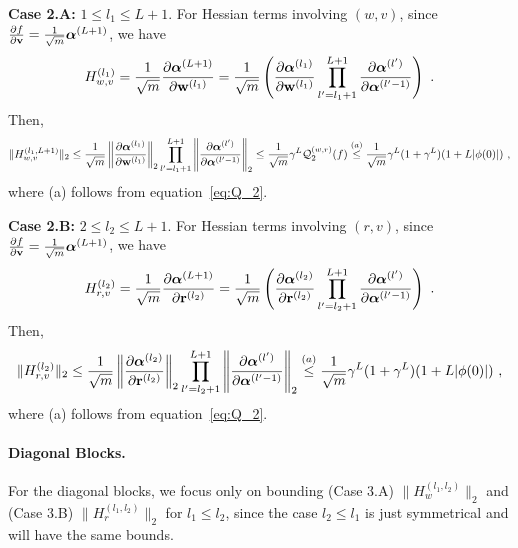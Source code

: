 {\bf Case 2.A:} $1 \leq l_1 \leq L+1$. For Hessian terms involving $(w,v)$, since $\frac{\partial f}{\partial \mathbf{v}} = \frac{1}{\sqrt{m}} \boldsymbol{\alpha}^{(L+1)}$, we have 
\begin{align*}
H_{w,v}^{(l_1)} = \frac{1}{\sqrt{m}}  \frac{\partial \boldsymbol{\alpha}^{(L+1)}}{\partial \mathbf{w}^{(l_1)}} = \frac{1}{\sqrt{m}} \left( \frac{\partial \boldsymbol{\alpha}^{(l_1)}}{\partial \mathbf{w}^{(l_1)}} \prod_{l'=l_1+1}^{L+1} \frac{\partial \boldsymbol{\alpha}^{(l')}}{\partial \boldsymbol{\alpha}^{(l'-1)}}  \right)~.
\end{align*}
Then,
\begin{align*}
 \| H_{w,v}^{(l_1,L+1)} \|_2 \leq \frac{1}{\sqrt{m}} \left\| \frac{\partial \boldsymbol{\alpha}^{(l_1)}}{\partial \mathbf{w}^{(l_1)}} \right\|_2 \prod_{l'=l_1+1}^{L+1} \left\| \frac{\partial \boldsymbol{\alpha}^{(l')}}{\partial \boldsymbol{\alpha}^{(l'-1)}} \right\|_2 \leq \frac{1}{\sqrt{m}} \gamma^L {\cal Q}_2^{(w,r)}(f)\overset{(a)}{\leq} \frac{1}{\sqrt{m}}\gamma^L(1+\gamma^L)(1+L|\phi(0)|)~,   
\end{align*}
where (a) follows from equation~\eqref{eq:Q_2}.

{\bf Case 2.B:} $2 \leq l_2 \leq L+1$. For Hessian terms involving $(r,v)$, since $\frac{\partial f}{\partial \mathbf{v}} = \frac{1}{\sqrt{m}} \boldsymbol{\alpha}^{(L+1)}$,  we have 
\begin{align*}
H_{r,v}^{(l_2)} = \frac{1}{\sqrt{m}}  \frac{\partial \boldsymbol{\alpha}^{(L+1)}}{\partial \mathbf{r}^{(l_2)}}
= \frac{1}{\sqrt{m}} \left( \frac{\partial \boldsymbol{\alpha}^{(l_2)}}{\partial \mathbf{r}^{(l_2)}} \prod_{l'=l_2+1}^{L+1} \frac{\partial \boldsymbol{\alpha}^{(l')}}{\partial \boldsymbol{\alpha}^{(l'-1)}}  \right)~.
\end{align*}
Then,
\begin{align*}
 \| H_{r,v}^{(l_2)} \|_2 \leq \frac{1}{\sqrt{m}} \left\| \frac{\partial \boldsymbol{\alpha}^{(l_2)}}{\partial \mathbf{r}^{(l_2)}} \right\|_2 \prod_{l'=l_2+1}^{L+1} \left\| \frac{\partial \boldsymbol{\alpha}^{(l')}}{\partial \boldsymbol{\alpha}^{(l'-1)}} \right\|_2 \overset{(a)}{\leq} \frac{1}{\sqrt{m}}\gamma^L(1+\gamma^L)(1+L|\phi(0)|)~,   
\end{align*}
where (a) follows from equation~\eqref{eq:Q_2}.



\paragraph{Diagonal Blocks.} 
For the diagonal blocks, we focus only on bounding (Case 3.A) $\| H_{w}^{(l_1,l_2)} \|_2$ and (Case 3.B) $\| H_{r}^{(l_1,l_2)} \|_2$ for $l_1 \leq l_2$, since the case $l_2 \leq l_1$ is just symmetrical and will have the same bounds. 

